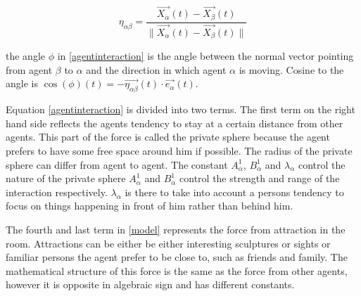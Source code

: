 \begin{equation}
    \eta_{\alpha \beta} =
        \frac{\vec{X_{\alpha}}(t) - \vec{X_{\beta}}(t)}
             {\|\vec{X_{\alpha}}(t) - \vec{X_{\beta}}(t) \|}
\end{equation}

the angle $\phi$ in \eqref{agentinteraction} is the angle between the normal 
vector pointing from agent $\beta$ to $\alpha$ and the direction in which 
agent $\alpha$ is moving. Cosine to the angle is $\cos \left( \phi 
\right)\left( t \right) = - \vec{\eta_{\alpha \beta}}\left( t \right) \cdot 
\vec{e_{\alpha}}\left( t \right)$.

Equation \eqref{agentinteraction} is divided into two terms. The first term on 
the right hand side reflects the agents tendency to stay at a certain distance 
from other agents. This part of the force is called the private sphere because 
the agent prefers to have some free space around him if possible. The radius 
of the private sphere can differ from agent to agent. The constant 
$A_{\alpha}^{1}$, $B_{\alpha}^{1}$ and $\lambda_{\alpha}$ control the nature 
of the private sphere $A_{\alpha}^1$ and $B_{\alpha}^1$ control the strength 
and range of the interaction respectively. $\lambda_{\alpha}$ is there to take 
into account a persons tendency to focus on things happening in front of him 
rather than behind him.

The fourth and last term in \eqref{model} represents the force from attraction 
in the room. Attractions can be either be either interesting sculptures or 
sights or familiar persons the agent prefer to be close to, such as friends 
and family. The mathematical structure of this force is the same as the force 
from other agents, however it is opposite in algebraic sign and has different 
constants. 

